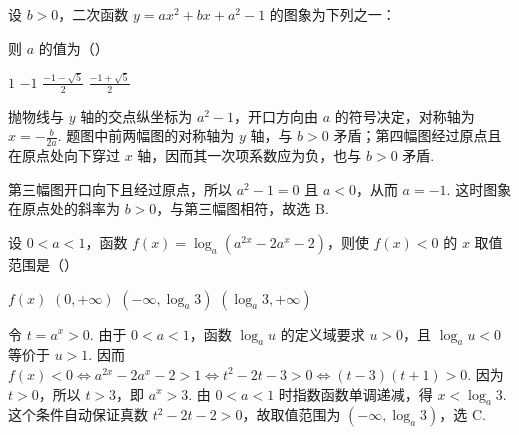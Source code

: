 \begin{problem}
设 \(b > 0\)，二次函数 \(y = ax^{2} + bx + a^{2} - 1\) 的图象为下列之一：





则 \(a\) 的值为（\quad）

\choices
    {\(1\)}
    {\(-1\)}
    {\(\frac{-1-\sqrt{5}}{2}\)}
    {\(\frac{-1+\sqrt{5}}{2}\)}

\begin{solution}
抛物线与 \(y\) 轴的交点纵坐标为 \(a^{2}-1\)，开口方向由 \(a\) 的符号决定，对称轴为 \(x=-\frac{b}{2a}\). 题图中前两幅图的对称轴为 \(y\) 轴，与 \(b>0\) 矛盾；第四幅图经过原点且在原点处向下穿过 \(x\) 轴，因而其一次项系数应为负，也与 \(b>0\) 矛盾.

第三幅图开口向下且经过原点，所以 \(a^{2}-1=0\) 且 \(a<0\)，从而 \(a=-1\). 这时图象在原点处的斜率为 \(b>0\)，与第三幅图相符，故选 B.
\end{solution}
\end{problem}

\begin{problem}
设 \(0 < a < 1\)，函数 \(f(x) = \log_a(a^{2x} - 2a^x - 2)\)，则使 \(f(x) < 0\) 的 \(x\) 取值范围是（\quad）

\choices
    {\(f(x)\)}
    {\((0, +\infty)\)}
    {\(\left(-\infty, \log_a 3\right)\)}
    {\((\log_a 3, +\infty)\)}

\begin{solution}
令 \(t=a^{x}>0\). 由于 \(0<a<1\)，函数 \(\log_{a}u\) 的定义域要求 \(u>0\)，且 \(\log_{a}u<0\) 等价于 \(u>1\). 因而
\(f(x)<0\iff a^{2x}-2a^{x}-2>1\iff t^{2}-2t-3>0\iff (t-3)(t+1)>0\).
因为 \(t>0\)，所以 \(t>3\)，即 \(a^{x}>3\). 由 \(0<a<1\) 时指数函数单调递减，得 \(x<\log_{a}3\). 这个条件自动保证真数 \(t^{2}-2t-2>0\)，故取值范围为 \((-\infty,\log_{a}3)\)，选 C.
\end{solution}
\end{problem}

